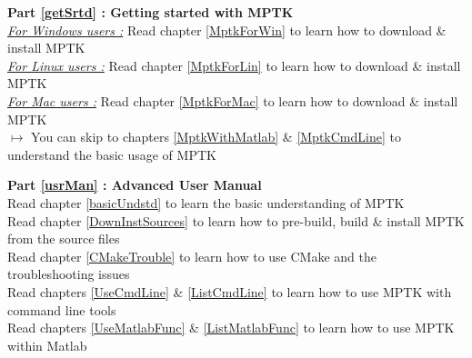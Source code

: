 \begin{my_itemize}
	\item \textbf{\large Part \ref{getSrtd} : Getting started with MPTK}\\
		\underline{\emph{For Windows users :}} Read chapter \ref{MptkForWin} to learn how to download \& install MPTK\\
		\underline{\emph{For Linux users :}} Read chapter \ref{MptkForLin} to learn how to download \& install MPTK\\
		\underline{\emph{For Mac users :}} Read chapter \ref{MptkForMac} to learn how to download \& install MPTK\\
		$\mapsto$ You can skip to chapters \ref{MptkWithMatlab} \& \ref{MptkCmdLine} to understand the basic usage of MPTK
	\item \textbf{\large Part \ref{usrMan} : Advanced User Manual}\\
		Read chapter \ref{basicUndstd} to learn the basic understanding of MPTK\\
		Read chapter \ref{DownInstSources} to learn how to pre-build, build \& install MPTK from the source files\\
		Read chapter \ref{CMakeTrouble} to learn how to use CMake and the troubleshooting issues\\
		Read chapters \ref{UseCmdLine} \& \ref{ListCmdLine} to learn how to use MPTK with command line tools\\
		Read chapters \ref{UseMatlabFunc} \& \ref{ListMatlabFunc} to learn how to use MPTK within Matlab
\end{my_itemize}

\clearpage